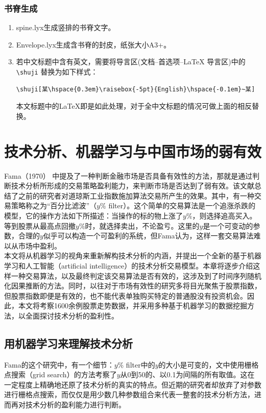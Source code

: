 \documentclass[twoside,longtitle]{LZUthesis}
\begin{document}
\subsection{书脊生成}
\begin{enumerate}
\item spine.lyx生成竖排的书脊文字。
\item Envelope.lyx生成含书脊的封皮，纸张大小A3+。
\item 若中文标题中含有英文，需要将导言区(文档--首选项--\LaTeX{} 导言区)中的\lstinline!\shuji! 替换为如下样式：\footnotesize
\begin{lstlisting}
\shuji[某\hspace{0.3em}\raisebox{-5pt}{English}\hspace{-0.1em}~某]
\end{lstlisting}
\normalsize 本文标题中的\LaTeX{}即是如此处理，对于全中文标题的情况可做上面的相反替换。
\end{enumerate}


\chapter{技术分析、机器学习与中国市场的弱有效}
Fama（1970）\cite{Malkiel1970EFFICIENT} 中提及了一种判断金融市场是否具备有效性的方法，那就是通过判断技术分析所形成的交易策略盈利能力，来判断市场是否达到了弱有效。该文献总结了之前的研究者对道琼斯工业指数施加算法交易所产生的效果。其中，有一种交易策略称之为“百分比滤波”（$y\%$ filter）。这个简单的交易算法是一个追涨杀跌的模型，它的操作方法如下所描述：当操作的标的物上涨了$y\%$，则选择追高买入。等到股票从最高点回撤$y\%$时，就选择卖出，不论盈亏。这里的$y$是一个可变动的参数，合理的$y$似乎可以构造一个可盈利的系统，但Fama认为，这样一套交易算法难以从市场中盈利。\\
本文将从机器学习的视角来重新解构技术分析的内涵，并提出一个全新的基于机器学习和人工智能（artificial intelligence）的技术分析交易模型。本章将逐步介绍这样一种交易算法，以及最终判定该交易算法是否有效的，这涉及到了时间序列随机化因果推断的方法。同时，以往对于市场有效性的研究多将目光聚焦于股票指数，但股票指数即便是有效的，也不能代表单独购买特定的普通股没有投资机会。因此，本文将考察1600余例股票走势数据，并采用多种基于机器学习的数据挖掘方法，以全面探讨技术分析的盈利性。
\section{用机器学习来理解技术分析}
Fama的这个研究中，有一个细节：$y\%$ filter中的$y$的大小是可变的，文中使用栅格点搜索（grid search）的方法考察了$y$从0到50的、以0.1为间隔的所有取值。这在一定程度上精确地还原了技术分析的真实的特点。但近期的研究者却放弃了对参数进行栅格点搜索，而仅仅是用少数几种参数组合来代表一整套的技术分析方法，进而再对技术分析的盈利能力进行判断。
\end{document}
